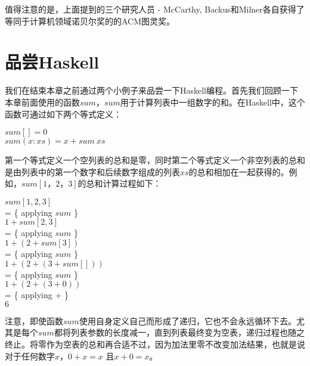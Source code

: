 值得注意的是，上面提到的三个研究人员 - McCarthy, Backus和Milner各自获得了等同于计算机领域诺贝尔奖的的ACM图灵奖。

\section{品尝Haskell}
我们在结束本章之前通过两个小例子来品尝一下Haskell编程。首先我们回顾一下本章前面使用的函数$sum$，$sum$用于计算列表中一组数字的和。在Haskell中，这个函数可通过如下两个等式定义：

\noindent\hspace*{1cm} $sum [] = 0$\\
\hspace*{1cm} $sum (x : xs) = x + sum~xs$

第一个等式定义一个空列表的总和是零，同时第二个等式定义一个非空列表的总和是由列表中的第一个数字和后续数字组成的列表$xs$的总和相加在一起获得的。例如，$sum [1，2，3]$的总和计算过程如下：

\noindent\hspace*{1cm} $sum [1, 2, 3]$\\
\hspace*{1cm} = \{ applying $sum$ \}\\
\hspace*{1cm} $1 + sum [2, 3]$\\
\hspace*{1cm} = \{ applying $sum$ \}\\
\hspace*{1cm} $1 + (2 + sum [3])$\\
\hspace*{1cm} = \{ applying $sum$ \}\\
\hspace*{1cm} $1 + (2 + (3 + sum [ ]))$\\
\hspace*{1cm} = \{ applying $sum$ \}\\
\hspace*{1cm} $1 + (2 + (3 + 0))$\\
\hspace*{1cm} = \{ applying + \}\\
\hspace*{1cm} $6$

注意，即使函数$sum$使用自身定义自己而形成了递归，它也不会永远循环下去。尤其是每个$sum$都将列表参数的长度减一，直到列表最终变为空表，递归过程也随之终止。将零作为空表的总和再合适不过，因为加法里零不改变加法结果，也就是说对于任何数字$x$，$0
+ x = x$ 且$x + 0 = x$。

